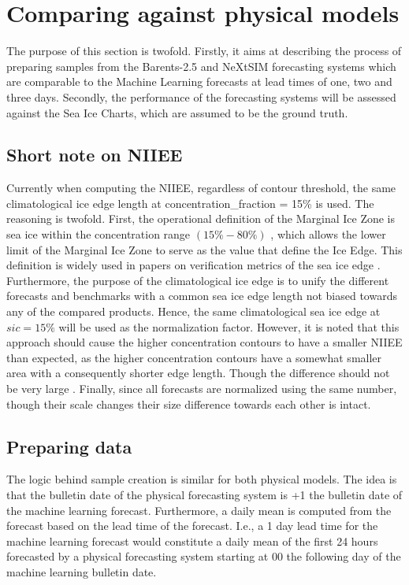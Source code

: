 \documentclass[../main/thesis.tex]{subfiles}
\begin{document}
\section{Comparing against physical models}
The purpose of this section is twofold. Firstly, it aims at describing the process of preparing samples from the Barents-2.5 and NeXtSIM forecasting systems which are comparable to the Machine Learning forecasts at lead times of one, two and three days. Secondly, the performance of the forecasting systems will be assessed against the Sea Ice Charts, which are assumed to be the ground truth.

\subsection{Short note on NIIEE}

Currently when computing the NIIEE, regardless of contour threshold, the same climatological ice edge length at concentration\_fraction = 15\% is used. The reasoning is twofold. First, the operational definition of the Marginal Ice Zone is sea ice within the concentration range $(15\% - 80\%)$ \citep{Dumont2022}, which allows the lower limit of the Marginal Ice Zone to serve as the value that define the Ice Edge. This definition is widely used in papers on verification metrics of the sea ice edge \citep{Dukhovskoy2015,Goessling2016,Goessling2018,Melsom2019}. Furthermore, the purpose of the climatological ice edge is to unify the different forecasts and benchmarks with a common sea ice edge length not biased towards any of the compared products. Hence, the same climatological sea ice edge at $sic = 15\%$ will be used as the normalization factor. However, it is noted that this approach should cause the higher concentration contours to have a smaller NIIEE than expected, as the higher concentration contours have a somewhat smaller area with a consequently shorter edge length. Though the difference should not be very large . Finally, since all forecasts are normalized using the same number, though their scale changes their size difference towards each other is intact.

\subsection{Preparing data}
The logic behind sample creation is similar for both physical models. The idea is that the bulletin date of the physical forecasting system is +1 the bulletin date of the machine learning forecast. Furthermore, a daily mean is computed from the forecast based on the lead time of the forecast. I.e., a 1 day lead time for the machine learning forecast would constitute a daily mean of the first 24 hours forecasted by a physical forecasting system starting at 00 the following day of the machine learning bulletin date. 
\end{document}
